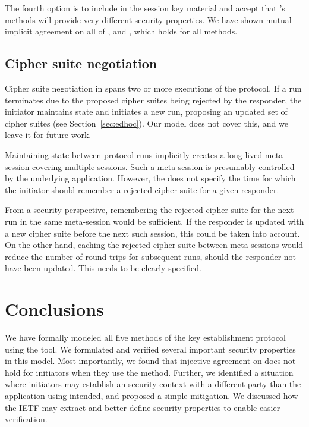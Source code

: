 \documentclass[runningheads, envcountsame, a4paper, draft, x11names]{llncs}
\newcommand{\spacehack}{\vspace{-1em}}
\newcommand{\fillhack}{\vspace{-0.5em}}
\begin{document}
The fourth option is to include \mGiy{} in the session key material and accept
that \mEdhoc{}'s methods will provide very different security properties.
%
We have shown mutual implicit agreement on all of \mGxy{}, \mGiy{} and \mGrx{},
which holds for all methods.
%

\spacehack
\subsection{Cipher suite negotiation}
\label{sec:ciphersuiteNegotiation}
\fillhack
{}
%
Cipher suite negotiation in \mEdhoc{} spans two or more executions of the
protocol.
%
If a run terminates due to the proposed cipher suites being rejected by the
responder, the initiator maintains state and initiates a new run, proposing
an updated set of cipher suites (see Section~\ref{sec:edhoc}).
%
Our model does not cover this, and we leave it for future work.

Maintaining state between protocol runs implicitly creates a long-lived
meta-session covering multiple \mEdhoc{} sessions.
%
Such a meta-session is presumably controlled by the underlying application.
%
However, the \mSpec{} does not specify the time for which the initiator should
remember a rejected cipher suite for a given responder.
%

From a security perspective, remembering the rejected cipher suite for the
next \mEdhoc{} run in the same meta-session would be sufficient.
%
If the responder is updated with a new cipher suite before the next such
session, this could be taken into account. On the other hand, caching the
rejected cipher suite between meta-sessions would reduce the number of
round-trips for subsequent runs, should the responder not have been updated.
%
This needs to be clearly specified. 

\spacehack
\section{Conclusions}
\label{sec:conclusions}
\fillhack
We have formally modeled all five
methods of the \mEdhoc{} key establishment protocol using the \mTamarin{} tool.
%
We formulated and verified several important security properties in this model. 
%
%
Most importantly, we found that injective agreement on \mGiy{} does not hold for
initiators when they use the \mStat{} method.
%
Further, we identified a situation where initiators may establish an \mOscore{}
security context with a different party than the application using \mEdhoc{}
intended, and proposed a simple mitigation.
%
We discussed how the IETF may extract and better define security properties to
enable easier verification.
%
\end{document}
